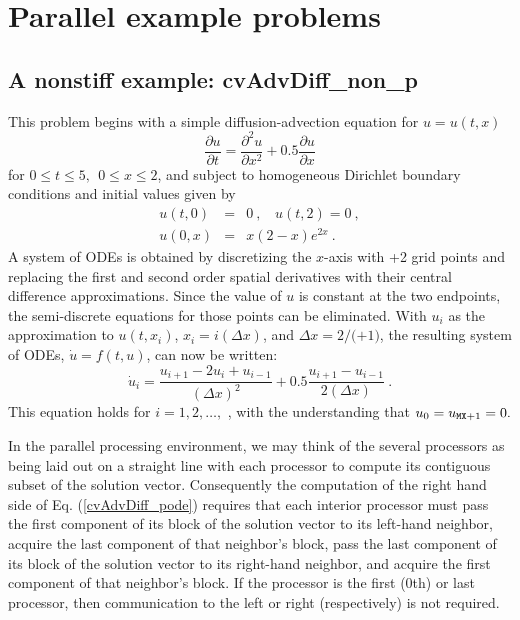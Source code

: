 \section{Parallel example problems}\label{s:ex_parallel}

\subsection{A nonstiff example: cvAdvDiff\_non\_p}\label{ss:cvAdvDiff_p}

This problem begins with a simple diffusion-advection equation
for $u=u(t,x)$
\begin{equation}
\frac{\partial u}{\partial t}=\frac{\partial ^{2}u}{\partial x^{2}}
   + 0.5\frac{\partial u}{\partial x}  \label{PDE1}
\end{equation}
for $0 \leq t \leq 5, ~~ 0\leq x \leq 2$, and subject to homogeneous
Dirichlet boundary conditions and initial values given by
\begin{eqnarray}
u(t,0) &=& 0 ~,~~~~u(t,2) = 0 ~, \label{BCIC1} \\
u(0,x) &=& x(2-x)e^{2x} ~. \nonumber
\end{eqnarray}
A system of  ODEs is obtained by discretizing the $x$-axis with +2
grid points and replacing the first and second order spatial derivatives
with their central difference approximations. Since the value of $u$ is
constant at the two endpoints, the semi-discrete equations for those points
can be eliminated.  With $u_{i}$ as the approximation to $u(t,x_{i})$,
$x_{i} = i(\Delta x)$, and $\Delta x = 2/($$+1)$, the resulting system of
ODEs, $\dot{u} = f(t,u)$, can now be written:
\begin{equation}
\dot{u}_i=\frac{u_{i+1}-2u_{i}+u_{i-1}}{(\Delta x)^{2}}
  + 0.5 \frac{u_{i+1}-u_{i-1}}{2(\Delta x)} ~. \label{cvAdvDiff_pode}
\end{equation}
This equation holds for $i=1,2,\ldots ,$ , with the understanding
that $u_{0} = u_{{\tt MX}+1}=0.$

In the parallel processing environment, we may think of the several
processors as being laid out on a straight line with each processor to
compute its contiguous subset of the solution vector.  Consequently
the computation of the right hand side of Eq. (\ref{cvAdvDiff_pode}) requires
that each interior processor must pass the first component of its block of
the solution vector to its left-hand neighbor, acquire the last component of
that neighbor's block, pass the last component of its block of the solution
vector to its right-hand neighbor, and acquire the first component of that
neighbor's block. If the processor is the first ($0$th) or last processor,
then communication to the left or right (respectively) is not required.

